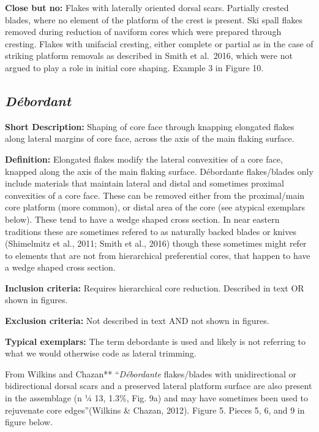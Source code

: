 \documentclass[
]{article}
\begin{document}
\textbf{Close but no:} Flakes with laterally oriented dorsal scars.
Partially crested blades, where no element of the platform of the crest
is present. Ski spall flakes removed during reduction of naviform cores
which were prepared through cresting. Flakes with unifacial cresting,
either complete or partial as in the case of striking platform removals
as described in Smith et al.~2016, which were not argued to play a role
in initial core shaping. Example 3 in Figure 10.

\hypertarget{duxe9bordant}{%
\subsection{\texorpdfstring{\emph{Débordant}}{Débordant}}\label{duxe9bordant}}

\textbf{Short Description:} Shaping of core face through knapping
elongated flakes along lateral margins of core face, across the axis of
the main flaking surface.

\textbf{Definition:} Elongated flakes modify the lateral convexities of
a core face, knapped along the axis of the main flaking surface.
Débordante flakes/blades only include materials that maintain lateral
and distal and sometimes proximal convexities of a core face. These can
be removed either from the proximal/main core platform (more common), or
distal area of the core (see atypical exemplars below). These tend to
have a wedge shaped cross section. In near eastern traditions these are
sometimes refered to as naturally backed blades or knives (Shimelmitz et
al., 2011; Smith et al., 2016) though these sometimes might refer to
elements that are not from hierarchical preferential cores, that happen
to have a wedge shaped cross section.

\textbf{Inclusion criteria:} Requires hierarchical core reduction.
Described in text OR shown in figures.

\textbf{Exclusion criteria:} Not described in text AND not shown in
figures.

\textbf{Typical exemplars:} The term debordante is used and likely is
not referring to what we would otherwise code as lateral trimming.

From Wilkins and Chazan** ``\emph{Débordante} flakes/blades with
unidirectional or bidirectional dorsal scars and a preserved lateral
platform surface are also present in the assemblage (n ¼ 13, 1.3\%, Fig.
9a) and may have sometimes been used to rejuvenate core edges''(Wilkins
\& Chazan, 2012). Figure 5. Pieces 5, 6, and 9 in figure below.
\end{document}
